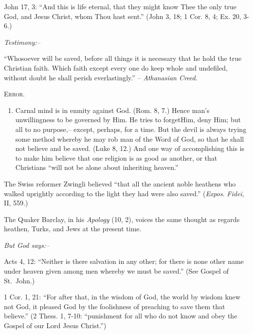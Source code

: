 \documentclass[
]{book}
\providecommand{\tightlist}{%
  \setlength{\itemsep}{0pt}\setlength{\parskip}{0pt}}
\begin{document}
John 17, 3: ``And this is life eternal, that they might know Thee the only true God, and Jesus Christ, whom Thou hast sent.'' (John 3, 18; 1 Cor. 8, 4; Ex. 20, 3-6.)

\begin{center}
\textsl{Testimony:--}
\end{center}

``Whosoever will be saved, before all things it is necessary that he hold the true Christian faith. Which faith except every one do keep whole and undefiled, without doubt he shall perish everlastingly.'' -- \emph{Athanasian Creed}.

\begin{center}
\textsc{Error.}
\end{center}

\begin{enumerate}
\def\labelenumi{\arabic{enumi}.}
\tightlist
\item
  Carnal mind is in enmity against God. (Rom. 8, 7.) Hence man's unwillingness to be governed by Him. He tries to forgetHim, deny Him; but all to no purpose,-- except, perhaps, for a time. But the devil is always trying some method whereby he may rob man of the Word of God, so that he shall not believe and be saved. (Luke 8, 12.) And one way of accomplishing this is to make him believe that one religion is as good as another, or that Christians ``will not be alone about inheriting heaven.''
\end{enumerate}

The Swiss reformer Zwingli believed ``that all the ancient noble heathens who walked uprightly according to the light they had were also saved.'' (\emph{Expos}. \emph{Fidei}, II, 559.)

The Quaker Barclay, in his \emph{Apology} (10, 2), voices the same thought as regards heathen, Turks, and Jews at the present time.

\begin{center}
\textsl{But God says:--}
\end{center}

Acts 4, 12: ``Neither is there salvation in any other; for there is none other name under heaven given among men whereby we must be saved.'' (See Gospel of St.~John.)

1 Cor. 1, 21: ``For after that, in the wisdom of God, the world by wisdom knew not God, it pleased God by the foolishness of preaching to save them that believe.'' (2 Thess. 1, 7-10: ``punishment for all who do not know and obey the Gospel of our Lord Jesus Christ.'')
\end{document}
